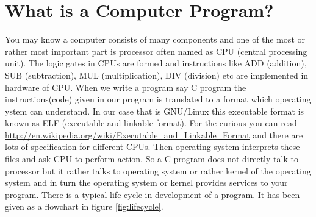 \section{What is a Computer Program?}
You may know a computer consists of many components and one of the
most or rather most important part is processor often named as CPU (central
processing unit). The logic gates in CPUs are formed and instructions like ADD
(addition), SUB (subtraction), MUL (multiplication), DIV (division) etc are
implemented in hardware of CPU. When we write a program say C program the
instructions(code) given in our program is translated to a format which
operating  ystem can understand. In our case that is GNU/Linux this executable
format is known as ELF (executable and linkable format). For the curious you
can read \url{http://en.wikipedia.org/wiki/Executable_and_Linkable_Format} and
there are lots of specification for different CPUs. Then operating system
interprets these files and ask CPU to perform action. So a C program does not
directly talk to processor but it rather talks to operating system or rather
kernel of the operating system and in turn the operating system or kernel
provides services to your program. There is a typical life cycle in development
of a program. It has been given as a flowchart in figure \ref{fig:lifecycle}.


